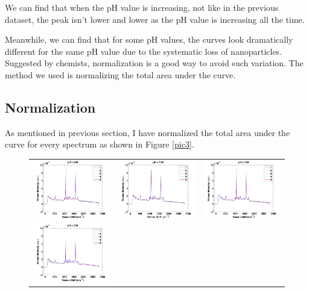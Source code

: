 \documentclass[a4paper]{article}
\begin{document}
We can find that when the pH value is increasing, not like in the previous dataset, the peak isn't lower and lower as the pH value is increasing all the time.

Meanwhile, we can find that for some pH values, the curves look dramatically different for the same pH value due to the systematic loss of nanoparticles. Suggested by chemists, normalization is a good way to avoid such variation. The method we used is normalizing the total area under the curve.
\subsection{Normalization}
As mentioned in previous section, I have normalized the total area under the curve for every spectrum as shown in Figure \ref{pic3}.
\begin{figure}[h]
\centering
\begin{tabular}{ccc}
\includegraphics[width=.33\textwidth]{images/n1.pdf}  & 
\includegraphics[width=.33\textwidth]{images/n2.pdf}  &
\includegraphics[width=.33\textwidth]{images/n3.pdf}  \\ 
\includegraphics[width=.33\textwidth]{images/n4.pdf}  &

\end{tabular}
\end{figure}
\end{document}
